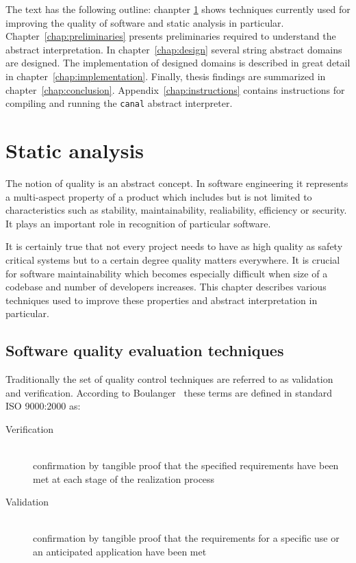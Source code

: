 \documentclass[12pt,final,oneside]{fithesis2}
\theoremstyle{definition}
\begin{document}
The text has the following outline: chanpter \ref{chap:staticanalysis} shows
techniques currently used for improving the quality of software and static
analysis in particular. Chapter~\ref{chap:preliminaries}
presents preliminaries required to understand the abstract interpretation.
In chapter~\ref{chap:design} several string abstract domains are designed.
The implementation of designed domains is described in great detail in
chapter~\ref{chap:implementation}. Finally, thesis findings are summarized
in chapter~\ref{chap:conclusion}. Appendix~\ref{chap:instructions} contains
instructions for compiling and running the \texttt{canal} abstract
interpreter.


\chapter{Static analysis}
\label{chap:staticanalysis}

The notion of quality is an abstract concept. In software engineering it
represents a multi-aspect property of a product which includes but is not
limited to characteristics such as stability, maintainability, realiability,
efficiency or security. It plays an important role in recognition of
particular software.

It is certainly true that not every project needs to have as high quality as
safety critical systems but to a certain degree quality matters
everywhere. It is crucial for software maintainability which becomes
especially difficult when size of a codebase and number of developers
increases. This chapter describes various techniques used to
improve these properties and abstract interpretation in particular.


\section{Software quality evaluation techniques}
\label{sec:softwarequality}

Traditionally the set of quality control techniques are referred to as
validation and verification. According to
Boulanger~\cite{Boulanger12-1} these terms are defined in standard
ISO 9000:2000 as:

\begin{description}

\item[Verification] \hfill \\
confirmation by tangible proof that the specified requirements have
been met at each stage of the realization process

\item[Validation] \hfill \\
confirmation by tangible proof that the requirements for a specific use or
an anticipated application have been met

\end{description}
\end{document}
